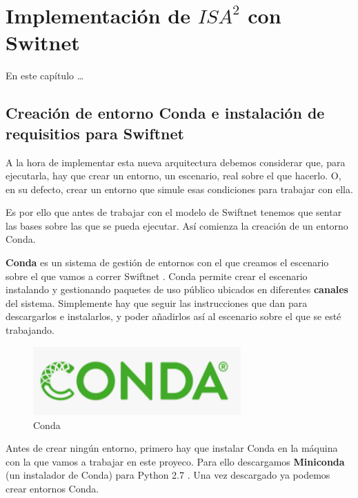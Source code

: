 \chapter{Implementación de $ISA^{2}$ con Switnet}

En este capítulo \ldots


\section{Creación de entorno Conda e instalación de requisitios para Swiftnet}
A la hora de implementar esta nueva arquitectura debemos considerar que, para ejecutarla, hay que crear un entorno, un escenario, real sobre el que hacerlo. O, en su defecto, crear un entorno que simule esas condiciones para trabajar con ella.

Es por ello que antes de trabajar con el modelo de Swiftnet \cite{swiftnet} tenemos que sentar las bases sobre las que se pueda ejecutar. Así comienza la creación de un entorno Conda.

\textbf{Conda} \cite{conda} es un sistema de gestión de entornos con el que creamos el escenario sobre el que vamos a correr Swiftnet \cite{swiftnet}. Conda permite crear el escenario instalando y gestionando paquetes de uso público ubicados en diferentes \textbf{canales} del sistema. Simplemente hay que seguir las instrucciones que dan para descargarlos e instalarlos, y poder añadirlos así al escenario sobre el que se esté trabajando.

\begin{figure}[H]
  \centering
  \includegraphics[width=8cm]{Figuras/Conda.eps}
  \caption{Conda}
\end{figure}

Antes de crear ningún entorno, primero hay que instalar Conda en la máquina con la que vamos a trabajar en este proyeco. Para ello descargamos \textbf{Miniconda} (un instalador de Conda) para Python 2.7 \cite{miniconda_install}. Una vez descargado ya podemos crear entornos Conda.


